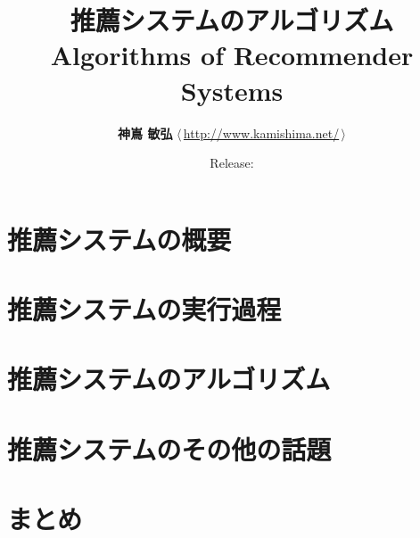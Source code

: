\documentclass[a4paper,12pt,oneside]{jsbook}
\title{\Huge\sffamily\bfseries 推薦システムのアルゴリズム\\\medskip\Large Algorithms of Recommender Systems}
\author{\Large\textbf{神嶌 敏弘} \quad$\langle\,$\url{http://www.kamishima.net/}$\,\rangle$}
\date{Release: }
\begin{document}
\frontmatter

\maketitle

\onehalfspacing





\tableofcontents

\mainmatter


\part{推薦システムの概要}
\label{part:overview}




\part{推薦システムの実行過程}
\label{part:process}





\part{推薦システムのアルゴリズム}
\label{part:algorithm}







\part{推薦システムのその他の話題}
\label{part:topic}




\part{まとめ}
\label{part:conclusion}





\backmatter

\singlespacing
\small



\printindex
\end{document}
